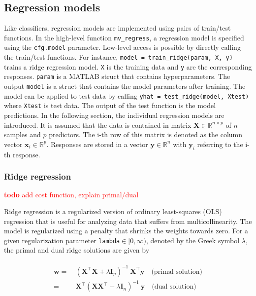 \documentclass[utf8]{frontiersSCNS} %
\newcommand{\w}{\mathbf{w}}
\newcommand{\x}{\mathbf{x}}
\newcommand{\y}{\mathbf{y}}
\newcommand{\I}{\mathbf{I}}
\newcommand{\R}{\mathbb{R}}
\newcommand{\X}{\mathbf{X}}
\newcommand{\ttt}[1]{\texttt{#1}}
\newcommand{\todo}[1]{\textcolor{red}{\textbf{todo} #1}}
\begin{document}
\subsection{Regression models}\label{sec:regression}

Like classifiers, regression models are implemented using pairs of train/test functions. In the high-level function \ttt{mv\_regress}, a regression model is specified using the \ttt{cfg.model} parameter. Low-level access is possible by directly calling the train/test functions. For instance, \ttt{model = train\_ridge(param, X, y)} trains a ridge regression model. \ttt{X} is the training data and \ttt{y} are the corresponding responses. \ttt{param} is a MATLAB struct that contains hyperparameters. The output \ttt{model} is a struct that contains the model parameters after training. The model can be applied to test data by calling \ttt{yhat = test\_ridge(model, Xtest)} where \ttt{Xtest} is test data. The output of the test function is the model predictions. In the following section, the individual regression models are introduced. It is assumed that the data is contained in matrix $\X\in\R^{n \times p}$ of $n$ samples and $p$ predictors. The i-th row of this matrix is denoted as the column vector $\x_i\in\R^p$. Responses are stored in a vector $\y\in\R^n$ with $\y_i$ referring to the i-th response.

\subsubsection{Ridge regression}

\todo{add cost function, explain primal/dual}

Ridge regression is a regularized version of ordinary least-squares (OLS) regression that is useful for analyzing data that suffers from multicollinearity. The model is regularized using a penalty that shrinks the weights towards zero. For a given regularization parameter \ttt{lambda}$\in[0,\infty)$, denoted by the Greek symbol $\lambda$, the primal and dual ridge solutions are given by


\begin{align}
\begin{split}
\label{eq:ridge}
\w =\ & (\X^\top\X + \lambda\I_p)^{-1}\ \X^\top\y \quad\text{(primal solution)}\\
 =\ & \X^\top (\X\X^\top + \lambda\I_n)^{-1}\ \y \quad\text{(dual solution)}
\end{split}
\end{align}
\end{document}
